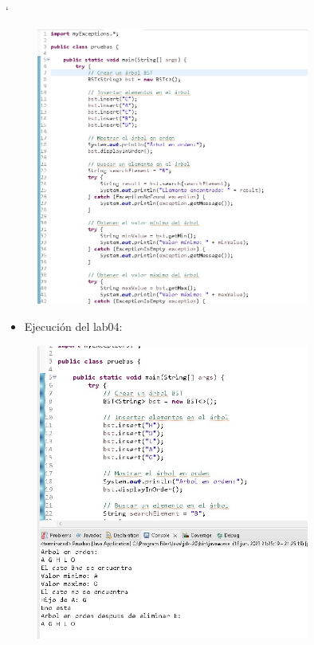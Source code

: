 \documentclass{article}
\begin{document}
`	\begin{figure}[H]
		\centering
		\includegraphics[width=0.8\textwidth,keepaspectratio]{img/codigo3.jpg}	
	\end{figure}
	
	
	\begin{itemize}	
		\item Ejecución del lab04:
	\end{itemize}
	
	\begin{figure}[H]
		\centering
		\includegraphics[width=0.8\textwidth,keepaspectratio]{img/ejecucion.jpg}	
	\end{figure}
	
\end{document}
